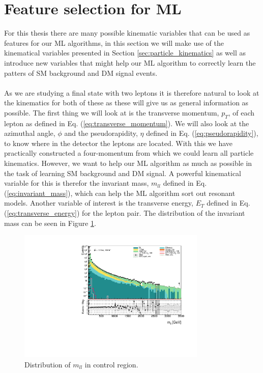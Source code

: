 \documentclass[12pt, a4paper]{book}
\begin{document}
\section{Feature selection for ML}
For this thesis there are many possible kinematic variables that can be used as features for our ML algorithms, in this section we will make use of the kinematical variables presented in Section \ref{sec:particle_kinematics} as well as introduce new variables that 
might help our ML algorithm to correctly learn the patters of SM background and DM signal events. \\
\\As we are studying a final state with two leptons it is therefore natural to look at the kinematics for both of these as these will give us as general information as possible. The first thing we will look at is the transverse momentum, $p_T$, of each lepton as defined in Eq. (\ref{eq:transverse_momentum}). 
We will also look at the azimuthal angle, $\phi$ and the pseudorapidity, $\eta$ defined in Eq. (\ref{eq:pseudorapidity}), to know where in the detector the leptons are located. 
With this we have practically constructed a four-momentum from which we could learn all particle kinematics. However, we want to help our ML algorithm as much as possible in the task of learning SM background and DM signal. A powerful kinematical variable for this is 
therefor the invariant mass, $m_{ll}$ defined in Eq. (\ref{eq:invariant_mass}), which can help the ML algorithm sort out resonant models. Another variable of interest is the transverse energy, $E_T$ defined in Eq. (\ref{eq:transverse_energy}) for the lepton pair. 
The distribution of the invariant mass can be seen in Figure \ref{fig:mll_dist}.\\
\graphicspath{{../../../Plots/Data_Analysis/SRs/Control_region/}} 
\begin{figure}[!ht]
    \centering
        \includegraphics[width=0.8\textwidth]{mll.pdf}
    \caption{Distribution of $m_{ll}$ in control region.}\label{fig:mll_dist}
\end{figure}
\end{document}
